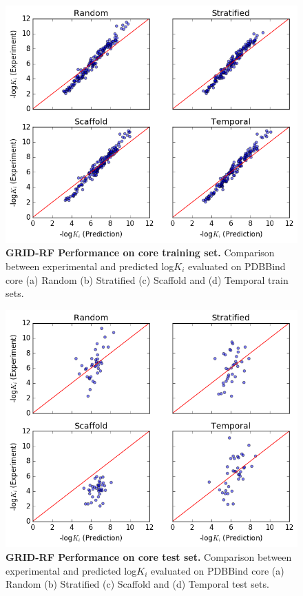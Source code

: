 \begin{figure}
    \centering
    \includegraphics[width=\textwidth]{Images/grid_core_train.png}
    \caption{\textbf{GRID-RF Performance on core training set.} Comparison between experimental and predicted log$K_i$ evaluated on PDBBind core (a) Random (b) Stratified (c) Scaffold and (d) Temporal train sets.}
    \label{fig:acnn_core_train}
\end{figure}
\begin{figure}
    \centering
    \includegraphics[width=\textwidth]{Images/grid_core_test.png}
    \caption{\textbf{GRID-RF Performance on core test set.} Comparison between experimental and predicted log$K_i$ evaluated on PDBBind core (a) Random (b) Stratified (c) Scaffold and (d) Temporal test sets.}
    \label{fig:acnn_core_test}
\end{figure}
